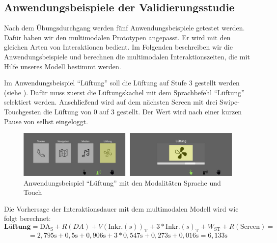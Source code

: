 \subsection[Anwendungsbeispiele]{Anwendungsbeispiele der Validierungsstudie}
Nach dem Übungsdurchgang werden fünf Anwendungsbeispiele getestet werden. 
Dafür haben wir den multimodalen Prototypen angepasst. 
Er wird mit den gleichen Arten von Interaktionen bedient. 
Im Folgenden beschreiben wir die Anwendungsbeispiele und berechnen die multimodalen Interaktionszeiten, die mit Hilfe unseres Modell bestimmt werden.
 
Im Anwendungsbeispiel "`Lüftung"' soll die Lüftung auf Stufe 3 gestellt werden (siehe ). 
Dafür muss zuerst die Lüftungskachel mit dem Sprachbefehl "`Lüftung"' selektiert werden. 
Anschließend wird auf dem nächsten Screen mit drei Swipe-Touchgesten die Lüftung von 0 auf 3 gestellt. 
Der Wert wird nach einer kurzen Pause von selbst eingeloggt.  
\begin{figure}[ht]
	\centering
		\includegraphics[width=1\textwidth]{img/UseCases_Eval_Luft.jpg}
	\caption[]{Anwendungsbeispiel "`Lüftung"' mit den Modalitäten Sprache und Touch}
	\label{fig:UseCasesEvalLuft}
\end{figure}
Die Vorhersage der Interaktionsdauer mit dem multimodalen Modell wird wie folgt berechnet:
\[
\textbf{Lüftung} = \text{DA}_\text{S} + R(DA) + V(\text{Inkr.} (s))_\text{T} + 3*\text{Inkr.} (s)_\text{T}  + W_\text{ST} + R(\text{Screen}) =
\]
\[
= 2,795\text{s} + 0,5\text{s} + 0,906\text{s} + 3*0,547\text{s} +  0,273\text{s} + 0,016\text{s} = 6,133\text{s}
\]

